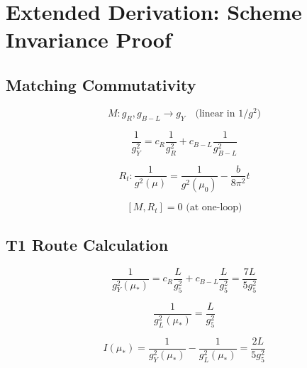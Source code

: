 \documentclass[11pt,a4paper]{article}
\theoremstyle{definition}
\begin{document}
\section{Extended Derivation: Scheme Invariance Proof}
\label{app:scheme_proof}

\subsection{Matching Commutativity}
\label{subsec:match_comm}

\begin{equation}
\label{eq:match_1}
M: g_R, g_{B-L} \to g_Y \quad \text{(linear in } 1/g^2\text{)}
\end{equation}

\begin{equation}
\label{eq:match_2}
\frac{1}{g_Y^2} = c_R\frac{1}{g_R^2} + c_{B-L}\frac{1}{g_{B-L}^2}
\end{equation}

\begin{equation}
\label{eq:match_3}
R_t: \frac{1}{g^2(\mu)} = \frac{1}{g^2(\mu_0)} - \frac{b}{8\pi^2}t
\end{equation}

\begin{equation}
\label{eq:match_4}
[M, R_t] = 0 \text{ (at one-loop)}
\end{equation}

\subsection{T1 Route Calculation}
\label{subsec:t1_calc}

\begin{equation}
\label{eq:t1_1}
\frac{1}{g_Y^2(\mu_*)} = c_R\frac{L}{g_5^2} + c_{B-L}\frac{L}{g_5^2} = \frac{7L}{5g_5^2}
\end{equation}

\begin{equation}
\label{eq:t1_2}
\frac{1}{g_L^2(\mu_*)} = \frac{L}{g_5^2}
\end{equation}

\begin{equation}
\label{eq:t1_3}
I(\mu_*) = \frac{1}{g_Y^2(\mu_*)} - \frac{1}{g_L^2(\mu_*)} = \frac{2L}{5g_5^2}
\end{equation}
\end{document}
